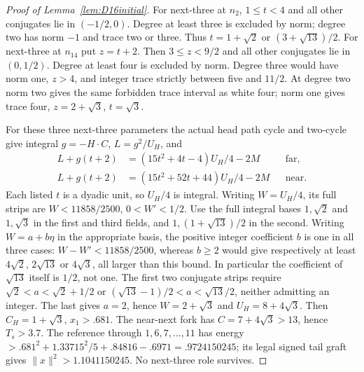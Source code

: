 \documentclass[11pt]{article}
\begin{document}
\begin{proof}[Proof of Lemma~\ref{lem:D16initial}]
For next-three at $n_2$, $1\le t<4$ and all other conjugates lie in
$(-1/2,0)$. Degree at least three is excluded by norm; degree two
has norm $-1$ and trace two or three. Thus
$t=1+\sqrt2$ or $(3+\sqrt{13})/2$.
For next-three at $n_{14}$ put $z=t+2$. Then $3\le z<9/2$ and
all other conjugates lie in $(0,1/2)$.
Degree at least four is excluded by norm. Degree three would have
norm one, $z>4$, and integer trace strictly between five and $11/2$.
At degree two norm two gives the same forbidden trace interval as
white four; norm one gives trace four, $z=2+\sqrt3$, $t=\sqrt3$.

For these three next-three parameters the actual head path cycle and
two-cycle give integral $g=-H\cdot C$, $L=g^2/U_H$, and
\[
\begin{split}
L+g(t+2)&=(15t^2+4t-4)U_H/4-2M&&\text{far},\\
L+g(t+2)&=(15t^2+52t+44)U_H/4-2M&&\text{near}.
\end{split}
\]
Each listed $t$ is a dyadic unit, so $U_H/4$ is integral.
Writing $W=U_H/4$, its full strips are
$W<11858/2500$, $0<W'<1/2$.
Use the full integral bases $1,\sqrt2$ and $1,\sqrt3$ in the
first and third fields, and $1,(1+\sqrt{13})/2$ in the second.
Writing $W=a+b\eta$ in the appropriate basis, the positive integer
coefficient $b$ is one in all three cases: $W-W'<11858/2500$,
whereas $b\ge2$ would give respectively at least
$4\sqrt2$, $2\sqrt{13}$ or $4\sqrt3$, all larger than this bound.
In particular the
coefficient of $\sqrt{13}$ itself is $1/2$, not one.
The first two conjugate strips require
$\sqrt2<a<\sqrt2+1/2$ or
$(\sqrt{13}-1)/2<a<\sqrt{13}/2$, neither admitting an integer.
The last gives $a=2$, hence $W=2+\sqrt3$ and $U_H=8+4\sqrt3$.
Then $C_H=1+\sqrt3$, $x_1>.681$.
The near-next fork has $C=7+4\sqrt3>13$, hence $T_s>3.7$.
The reference through $1,6,7,\ldots,11$ has energy
$>.681^2+1.33715^2/5+.84816-.6971=.9724150245$;
its legal signed tail graft gives
$\|x\|^2>1.1041150245$. No next-three role survives.


\end{proof}
\end{document}

